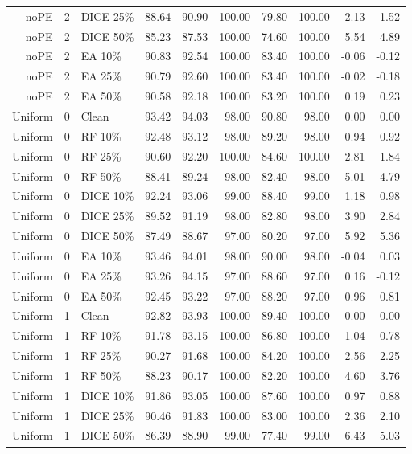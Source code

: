 {\begin{longtable}{rllrrrrrrr}
noPE & 2 & DICE 25\% & 88.64 & 90.90 & 100.00 & 79.80 & 100.00 & 2.13 & 1.52 \\
noPE & 2 & DICE 50\% & 85.23 & 87.53 & 100.00 & 74.60 & 100.00 & 5.54 & 4.89 \\
noPE & 2 & EA 10\% & 90.83 & 92.54 & 100.00 & 83.40 & 100.00 & -0.06 & -0.12 \\
noPE & 2 & EA 25\% & 90.79 & 92.60 & 100.00 & 83.40 & 100.00 & -0.02 & -0.18 \\
noPE & 2 & EA 50\% & 90.58 & 92.18 & 100.00 & 83.20 & 100.00 & 0.19 & 0.23 \\
Uniform & 0 & Clean & 93.42 & 94.03 & 98.00 & 90.80 & 98.00 & 0.00 & 0.00 \\
Uniform & 0 & RF 10\% & 92.48 & 93.12 & 98.00 & 89.20 & 98.00 & 0.94 & 0.92 \\
Uniform & 0 & RF 25\% & 90.60 & 92.20 & 100.00 & 84.60 & 100.00 & 2.81 & 1.84 \\
Uniform & 0 & RF 50\% & 88.41 & 89.24 & 98.00 & 82.40 & 98.00 & 5.01 & 4.79 \\
Uniform & 0 & DICE 10\% & 92.24 & 93.06 & 99.00 & 88.40 & 99.00 & 1.18 & 0.98 \\
Uniform & 0 & DICE 25\% & 89.52 & 91.19 & 98.00 & 82.80 & 98.00 & 3.90 & 2.84 \\
Uniform & 0 & DICE 50\% & 87.49 & 88.67 & 97.00 & 80.20 & 97.00 & 5.92 & 5.36 \\
Uniform & 0 & EA 10\% & 93.46 & 94.01 & 98.00 & 90.00 & 98.00 & -0.04 & 0.03 \\
Uniform & 0 & EA 25\% & 93.26 & 94.15 & 97.00 & 88.60 & 97.00 & 0.16 & -0.12 \\
Uniform & 0 & EA 50\% & 92.45 & 93.22 & 97.00 & 88.20 & 97.00 & 0.96 & 0.81 \\
Uniform & 1 & Clean & 92.82 & 93.93 & 100.00 & 89.40 & 100.00 & 0.00 & 0.00 \\
Uniform & 1 & RF 10\% & 91.78 & 93.15 & 100.00 & 86.80 & 100.00 & 1.04 & 0.78 \\
Uniform & 1 & RF 25\% & 90.27 & 91.68 & 100.00 & 84.20 & 100.00 & 2.56 & 2.25 \\
Uniform & 1 & RF 50\% & 88.23 & 90.17 & 100.00 & 82.20 & 100.00 & 4.60 & 3.76 \\
Uniform & 1 & DICE 10\% & 91.86 & 93.05 & 100.00 & 87.60 & 100.00 & 0.97 & 0.88 \\
Uniform & 1 & DICE 25\% & 90.46 & 91.83 & 100.00 & 83.00 & 100.00 & 2.36 & 2.10 \\
Uniform & 1 & DICE 50\% & 86.39 & 88.90 & 99.00 & 77.40 & 99.00 & 6.43 & 5.03 \\

\end{longtable}}
